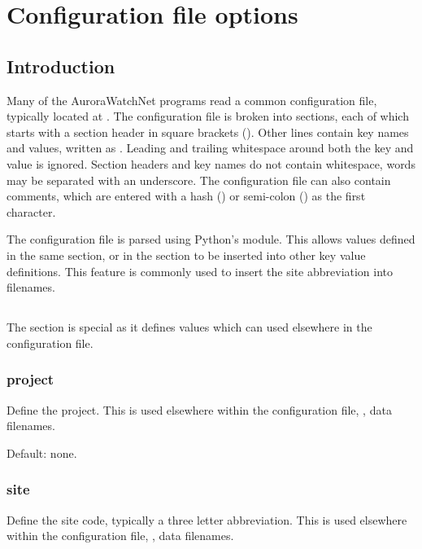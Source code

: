\chapter{Configuration file options}

\newcommand{\configexample}[2][]{\examplebox[#1]{#2}}

\section{Introduction}
Many of the AuroraWatchNet programs read a common configuration file,
typically located at . The configuration file
is broken into sections, each of which starts with a section header in
square brackets (). Other lines contain key names
and values, written as . Leading and trailing
whitespace around both the key and value is ignored. Section headers
and key names do not contain whitespace, words may be separated with an
underscore. The configuration file can also contain comments, which
are entered with a hash (\code{\#}) or semi-colon (\code{;}) as the
first character.

The configuration file is parsed using Python's 
module. This allows values defined in the same section, or in the
\code{[DEFAULT]} section to be inserted into other key value
definitions. This feature is commonly used to insert the site
abbreviation into filenames.

\section{\code{[DEFAULT]}}

The \code{[DEFAULT]} section is special as it defines values which can
used elsewhere in the configuration file.

\subsection{project}
Define the project. This is
used elsewhere within the configuration file, \eg, data filenames.

Default: none.

\subsection{site}
Define the site code, typically a three letter abbreviation. This is
used elsewhere within the configuration file, \eg, data filenames.

